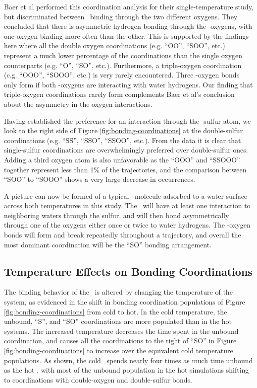 \documentclass{article}
\begin{document}
Baer et al performed this coordination analysis for their single-temperature study, but discriminated between \suldiox~binding through the two different oxygens. They concluded that there is asymmetric hydrogen bonding through the \suldiox-oxygens, with one oxygen binding more often than the other. This is supported by the findings here where all the double oxygen coordinations (e.g. ``OO'', ``SOO'', etc.) represent a much lower percentage of the coordinations than the single oxygen counterparts (e.g. ``O'', ``SO'', etc.). Furthermore, a triple-oxygen coordination (e.g. ``OOO'', ``SOOO'', etc.) is very rarely encountered. Three \suldiox-oxygen bonds only form if both \suldiox-oxygens are interacting with water hydrogens. Our finding that triple-oxygen coordinations rarely form complements Baer et al's conclusion about the asymmetry in the oxygen interactions.

Having established the preference for an interaction through the \suldiox-sulfur atom, we look to the right side of Figure \ref{fig:bonding-coordinations} at the double-sulfur coordinations (e.g. ``SS'', ``SSO'', ``SSOO'', etc.). From the data it is clear that single-sulfur coordinations are overwhelmingly preferred over double-sulfur ones. Adding a third oxygen atom is also unfavorable as the ``OOO'' and ``SSOOO'' together represent less than 1\% of the trajectories, and the comparison between ``SOO'' to ``SOOO'' shows a very large decrease in occurrences.

A picture can now be formed of a typical \suldiox~molecule adsorbed to a water surface across both temperatures in this study. The \suldiox~will have at least one interaction to neighboring waters through the sulfur, and will then bond asymmetrically through one of the oxygens either once or twice to water hydrogens. The \suldiox-oxygen bonds will form and break repeatedly throughout a trajectory, and overall the most dominant coordination will be the ``SO'' bonding arrangement.


\subsection {Temperature Effects on Bonding Coordinations}

The binding behavior of the \suldiox~is altered by changing the temperature of the system, as evidenced in the shift in bonding coordination populations of Figure \ref{fig:bonding-coordinations} from cold to hot. In the cold temperature, the unbound, ``S'', and ``SO'' coordinations are more populated than in the hot systems. The increased temperature decreases the time spent in the unbound coordination, and causes all the coordinations to the right of ``SO'' in Figure \ref{fig:bonding-coordinations} to increase over the equivalent cold temperature populations. As shown, the cold \suldiox~spends nearly four times as much time unbound as the hot \suldiox, with most of the unbound population in the hot simulations shifting to coordinations with double-oxygen and double-sulfur bonds. 
\end{document}
